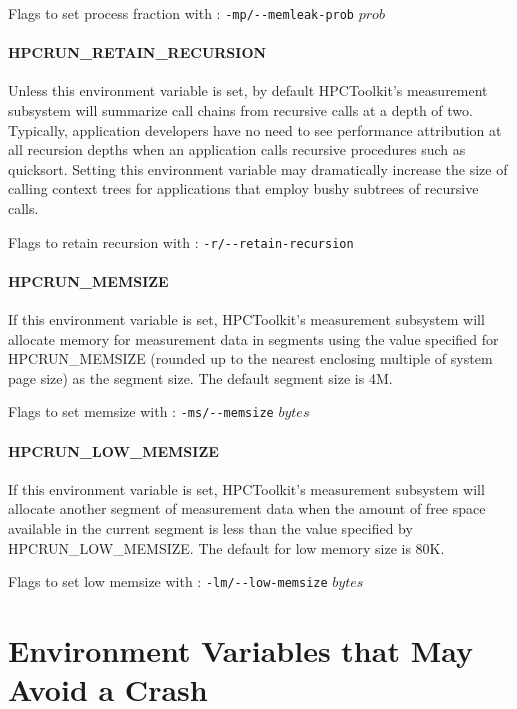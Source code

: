 \parg
Flags to set process fraction with \hpcrun: \verb|-mp/--memleak-prob| $prob$


\paragraph{HPCRUN\_RETAIN\_RECURSION}

Unless this environment variable is set, by default HPCToolkit's
measurement subsystem will summarize call chains from recursive calls
at a depth of two. Typically, application developers have no need
to see performance attribution at all recursion depths when an
application calls recursive procedures such as quicksort. Setting
this environment variable may dramatically increase the size of
calling context trees for applications that employ bushy subtrees
of recursive calls.

\parg
Flags to retain recursion with \hpcrun: \verb|-r/--retain-recursion|

\paragraph{HPCRUN\_MEMSIZE}

If this environment variable is set, HPCToolkit's measurement subsystem
will allocate memory for measurement data in segments using the
value specified for HPCRUN\_MEMSIZE (rounded up to the nearest
enclosing multiple of system page size) as the segment size. The
default segment size is 4M.

\parg
Flags to set memsize with \hpcrun: \verb|-ms/--memsize| $bytes$

\paragraph{HPCRUN\_LOW\_MEMSIZE}

If this environment variable is set, HPCToolkit's measurement subsystem
will allocate another segment of measurement data when the amount
of free space available in the current segment is less than the
value specified by HPCRUN\_LOW\_MEMSIZE. The default for low memory
size is 80K.

\parg
Flags to set low memsize with \hpcrun: \verb|-lm/--low-memsize| $bytes$

\section{Environment Variables that May Avoid a Crash}


